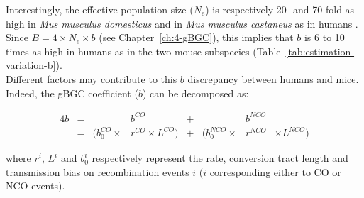 Interestingly, the effective population size ($N_e$) is respectively 20- and 70-fold as high in \textit{Mus musculus domesticus} and in \textit{Mus musculus castaneus} as in humans \citep{charlesworth2009fundamental,phifer-rixey2012adaptive}.
Since $B = 4 \times N_e \times b$ (see Chapter~\ref{ch:4-gBGC}), this implies that $b$ is 6 to 10 times as high in humans as in the two mouse subspecies (Table~\ref{tab:estimation-variation-b}).\\






Different factors may contribute to this $b$ discrepancy between humans and mice.
Indeed, the gBGC coefficient ($b$) can be decomposed as: 


\begin{alignat*}{4}
	    b&={}&                     &b^{CO}                   &{}+{}&                      &b^{NCO}& \\
	     &={}& ( b_{0}^{CO} \times &r^{CO} \times L^{CO}  )  &{}+{}& ( b_{0}^{NCO} \times &r^{NCO}& \times L^{NCO}  )
\end{alignat*}

where $r^{i}$, $L^{i}$ and $b_0^{i}$ respectively represent the rate, conversion tract length and transmission bias on recombination events $i$ ($i$ corresponding either to CO or NCO events).\\

